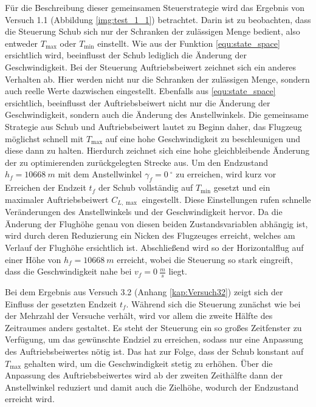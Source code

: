 Für die Beschreibung dieser gemeinsamen Steuerstrategie wird das Ergebnis von Versuch 1.1 (Abbildung \ref{img:test_1_1}) betrachtet. Darin ist zu beobachten, dass die Steuerung Schub sich nur der Schranken der zulässigen Menge bedient, also entweder $T_{\max}$ oder $T_{\min}$ einstellt. Wie aus der Funktion \ref{equ:state_space} ersichtlich wird, beeinflusst der Schub lediglich die Änderung der Geschwindigkeit. Bei der Steuerung Auftriebsbeiwert zeichnet sich ein anderes Verhalten ab. Hier werden nicht nur die Schranken der zulässigen Menge, sondern auch reelle Werte dazwischen eingestellt. Ebenfalls aus \ref{equ:state_space} ersichtlich, beeinflusst der Auftriebsbeiwert nicht nur die Änderung der Geschwindigkeit, sondern auch die Änderung des Anstellwinkels. Die gemeinsame Strategie aus Schub und Auftriebsbeiwert lautet zu Beginn daher, das Flugzeug möglichst schnell mit $T_{\max}$ auf eine hohe Geschwindigkeit zu beschleunigen und diese dann zu halten. Hierdurch zeichnet sich eine hohe gleichbleibende Änderung der zu optimierenden zurückgelegten Strecke aus. Um den Endzustand $h_f = 10668 \ m$ mit dem Anstellwinkel $\gamma_f = 0 \ ^\circ$ zu erreichen, wird kurz vor Erreichen der Endzeit $t_f$ der Schub vollständig auf $T_{\min}$ gesetzt und ein maximaler Auftriebsbeiwert $C_{L, \max}$ eingestellt. Diese Einstellungen rufen schnelle Veränderungen des Anstellwinkels und der Geschwindigkeit hervor. Da die Änderung der Flughöhe genau von diesen beiden Zustandsvariablen abhängig ist, wird durch deren Reduzierung ein Nicken des Flugzeuges erreicht, welches am Verlauf der Flughöhe ersichtlich ist. Abschließend wird so der Horizontalflug auf einer Höhe von $h_f = 10668 \ m$ erreicht, wobei die Steuerung so stark eingreift, dass die Geschwindigkeit nahe bei $v_f = 0 \ \frac{m}{s}$ liegt. 

Bei dem Ergebnis aus Versuch 3.2 (Anhang \ref{kap:Versuch32}) zeigt sich der Einfluss der gesetzten Endzeit $t_f$. Während sich die Steuerung zunächst wie bei der Mehrzahl der Versuche verhält, wird vor allem die zweite Hälfte des Zeitraumes anders gestaltet. Es steht der Steuerung ein so großes Zeitfenster zu Verfügung, um das gewünschte Endziel zu erreichen, sodass nur eine Anpassung des Auftriebsbeiwertes nötig ist. Das hat zur Folge, dass der Schub konstant auf $T_{\max}$ gehalten wird, um die Geschwindigkeit stetig zu erhöhen. Über die Anpassung des Auftriebsbeiwertes wird ab der zweiten Zeithälfte dann der Anstellwinkel reduziert und damit auch die Zielhöhe, wodurch der Endzustand erreicht wird.

